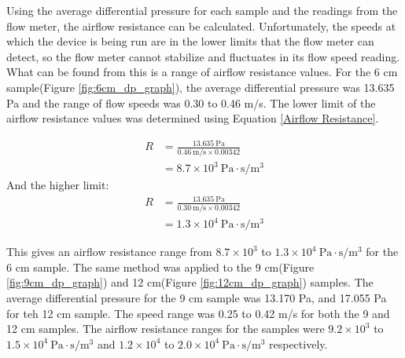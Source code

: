 	Using the average differential pressure for each sample and the readings from the 
flow meter, the airflow resistance can be calculated. Unfortunately, the speeds at which the 
device is being run are in the lower limits that the flow meter can detect, so the flow meter 
cannot stabilize and fluctuates in its flow speed reading. What can be found from this is a 
range of airflow resistance values. For the 6 cm sample(Figure \ref{fig:6cm_dp_graph}), the 
average differential pressure was 13.635 Pa and the range of flow speeds was 0.30 to 0.46 
m/s. The lower limit of the airflow resistance values was determined using Equation 
\ref{Airflow Resistance}. 

\begin{align}
R &= \frac{13.635\ \mathrm{Pa}}{0.46\ \mathrm{m/s} \times 0.00342} \\
  &= 8.7 \times 10^3\ \mathrm{Pa\cdot s/m^3}
\end{align}
And the higher limit:
\begin{align}
R &= \frac{13.635\ \mathrm{Pa}}{0.30\ \mathrm{m/s} \times 0.00342} \\
  &= 1.3 \times 10^4\ \mathrm{Pa\cdot s/m^3}
\end{align}

This gives an airflow resistance range from $8.7 \times 10^3$ to $1.3 \times 10^4\ 
\mathrm{Pa\cdot s/m^3}$ for the 6 cm sample.
	The same method was applied to the 9 cm(Figure \ref{fig:9cm_dp_graph}) and 12 
cm(Figure \ref{fig:12cm_dp_graph}) samples. The average differential pressure for the 9 cm 
sample was 13.170 Pa, and 17.055 Pa for teh 12 cm sample. The speed range was 0.25 to 0.42 
m/s for both the 9 and 12 cm samples. The airflow resistance ranges for the samples were $9.2 
\times 10^3$ to $1.5 \times 10^4\ \mathrm{Pa\cdot s/m^3}$ and $1.2 \times 10^4$ to $2.0 
\times 10^4\ \mathrm{Pa\cdot s/m^3}$ respectively.

 
